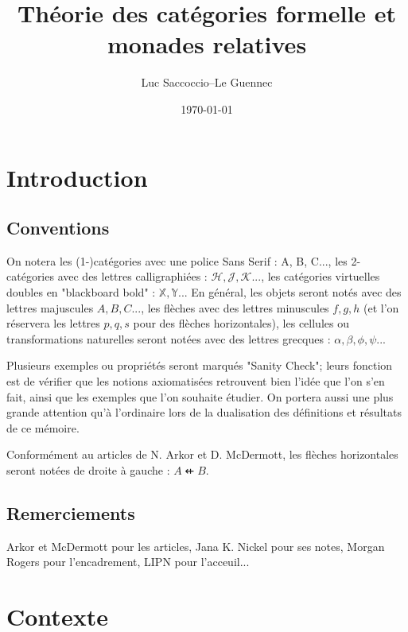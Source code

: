 \documentclass[8pt,a4paper,french,draft]{article}
\newcommand{\bb}[1]{\mathbb{#1}}
\newcommand{\ca}[1]{\mathcal{#1}}
\newcommand{\cat}[1]{\textcat{#1}}
\newcommand{\textcat}[1]{{\normalfont\textsf{#1}}}
\newcommand{\dfrom}{\nvleftarrow}
\theoremstyle{plain}
\theoremstyle{definition}
\theoremstyle{remark}
\begin{document}
\title{Théorie des catégories formelle et monades relatives}
\author{Luc Saccoccio--Le Guennec}
\date{\today}

\maketitle

\tableofcontents
\noindent\hrulefill

\section{Introduction}

\subsection{Conventions}

On notera les (1-)catégories avec une police Sans Serif : \cat{A}, \cat{B}, \cat{C}..., les 2-catégories avec des lettres calligraphiées : $\ca{H}, \ca{J}, \ca{K}$..., les catégories virtuelles doubles en "blackboard bold" : $\bb{X}, \bb{Y}$... En général, les objets seront notés avec des lettres majuscules $A, B, C...$, les flèches avec des lettres minuscules $f, g, h$ (et l'on réservera les lettres $p, q, s$ pour des flèches horizontales), les cellules ou transformations naturelles seront notées avec des lettres grecques : $\alpha, \beta, \phi, \psi$...

Plusieurs exemples ou propriétés seront marqués "Sanity Check"; leurs fonction est de vérifier que les notions axiomatisées retrouvent bien l'idée que l'on s'en fait, ainsi que les exemples que l'on souhaite étudier. On portera aussi une plus grande attention qu'à l'ordinaire lors de la dualisation des définitions et résultats de ce mémoire.

Conformément au articles de N. Arkor et D. McDermott, les flèches horizontales seront notées de droite à gauche : $A \dfrom B$.

\subsection{Remerciements}

Arkor et McDermott pour les articles, Jana K. Nickel pour ses notes, Morgan Rogers pour l'encadrement, LIPN pour l'acceuil...

\section{Contexte}
\end{document}
